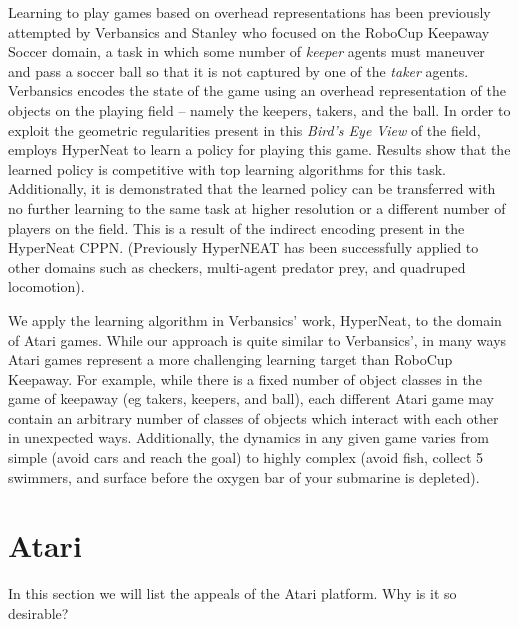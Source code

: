 \documentclass{acm_proc_article-sp}
\begin{document}
Learning to play games based on overhead representations has been previously attempted by Verbansics and Stanley\cite{verbancsics10} who focused on the RoboCup Keepaway Soccer domain\cite{stone01}, a task in which some number of \textit{keeper} agents must maneuver and pass a soccer ball so that it is not captured by one of the \textit{taker} agents. Verbansics encodes the state of the game using an overhead representation of the objects on the playing field -- namely the keepers, takers, and the ball. In order to exploit the geometric regularities present in this \textit{Bird's Eye View} of the field, employs HyperNeat to learn a policy for playing this game. Results show that the learned policy is competitive with top learning algorithms for this task. Additionally, it is demonstrated that the learned policy can be transferred with no further learning to the same task at higher resolution or a different number of players on the field. This is a result of the indirect encoding present in the HyperNeat CPPN. (Previously HyperNEAT has been successfully applied to other domains such as checkers\cite{gauci08}, multi-agent predator prey\cite{ambrosio08}, and quadruped locomotion\cite{clune09}). 

We apply the learning algorithm in Verbansics' work, HyperNeat, to the domain of Atari games. While our approach is quite similar to Verbansics', in many ways Atari games represent a more challenging learning target than RoboCup Keepaway. For example, while there is a fixed number of object classes in the game of keepaway (eg takers, keepers, and ball), each different Atari game may contain an arbitrary number of classes of objects which interact with each other in unexpected ways. Additionally, the dynamics in any given game varies from simple (avoid cars and reach the goal) to highly complex (avoid fish, collect 5 swimmers, and surface before the oxygen bar of your submarine is depleted).

\section{Atari}
\label{sec:atari}
In this section we will list the appeals of the Atari platform. Why is it so desirable?
\end{document}
